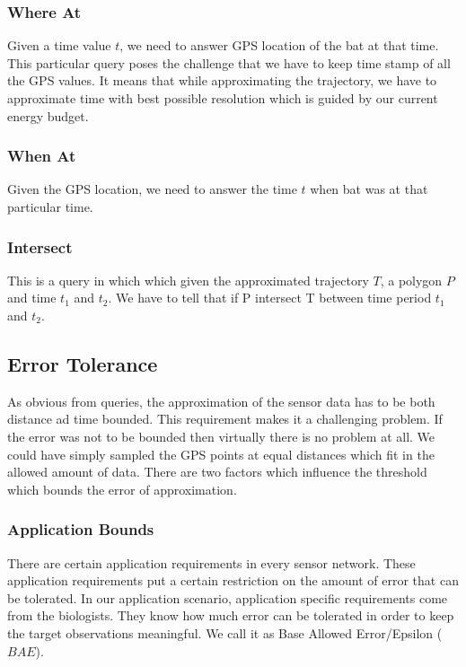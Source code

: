 \documentclass[conference]{IEEEtran}
\begin{document}
\subsubsection{Where At}
Given a time value $t$, we need to answer GPS location of the bat at that time. This particular 
query poses the challenge that we have to keep time stamp of all the GPS values. It means that while 
approximating the trajectory, we have to approximate time with best possible resolution which is guided 
by our current energy budget.
\subsubsection{When At}
Given the GPS location, we need to answer the time $t$ when bat was at that particular time. 
\subsubsection{Intersect}
This is a query in which which given the approximated trajectory $T$, a polygon $P$ and time $t_1$ and 
$t_2$. We have to tell that if P intersect T between time period $t_1$ and $t_2$.
\subsection{Error Tolerance}
As obvious from queries, the approximation of the sensor data has to be both distance ad time bounded. 
This requirement makes it a challenging problem. If the error was not to be bounded then virtually 
there is no problem at all. We could have simply sampled the GPS points at equal distances which fit 
in the allowed amount of data. There are two factors which influence the threshold which bounds the error 
of approximation.\

\subsubsection{Application Bounds}
There are certain application requirements in every sensor network. These application requirements 
put a certain restriction on the amount of error that can be tolerated. In our application scenario, 
application specific requirements come from the biologists. They know how much error can be tolerated 
in order to keep the target observations meaningful. We call it as Base Allowed Error/Epsilon ($BAE$).
\end{document}
